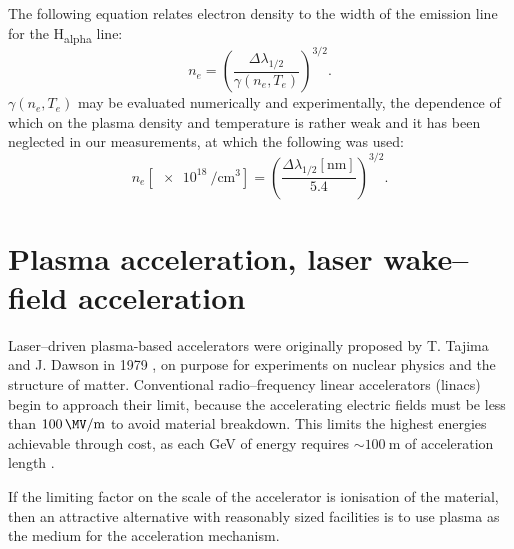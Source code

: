\documentclass[../main.tex]{subfiles}
\begin{document}
The following equation relates electron density to the width of the emission line for the H\textsubscript{alpha} line:
\begin{equation}
n_e=\left( \frac{\Delta\lambda_{1/2}}{\gamma\left(n_e,T_e\right)}\right)^{3/2}.
\end{equation}
$\gamma\left(n_e,T_e\right)$ may be evaluated numerically and experimentally\cite{Griem2005ComparisonResults}, the dependence of which on the plasma density and temperature is rather weak and it has been neglected in our measurements, at which the following was used:
\begin{equation}
n_e\left[\SI{e18}{\per\cubic\cm}\right]=\left( \frac{\Delta\lambda_{1/2}\left[\si{\nm}\right]}{5.4}\right)^{3/2}. \label{eq:delta_lambda}
\end{equation}


\section{Plasma acceleration, laser wake--field acceleration}\label{sec:wakefield}
Laser--driven plasma-based accelerators were originally proposed by T. Tajima and J. Dawson in 1979 \cite{Dawson1979}, on purpose for experiments on nuclear physics and the structure of matter. Conventional radio--frequency linear accelerators (linacs) begin to approach their limit, because the accelerating electric fields  must  be  less  than  $\SI{100}{\MV\per \m}$  to  avoid material breakdown. This limits the highest energies achievable through cost, as each \si{\GeV} of energy requires $\sim \SI{100}{\m}$ of acceleration length \cite{Esarey2009PhysicsAccelerators}.

If the limiting factor on the scale of the accelerator is ionisation of the material, then an attractive alternative with reasonably sized facilities is to use plasma as the medium for the acceleration mechanism.
\end{document}
